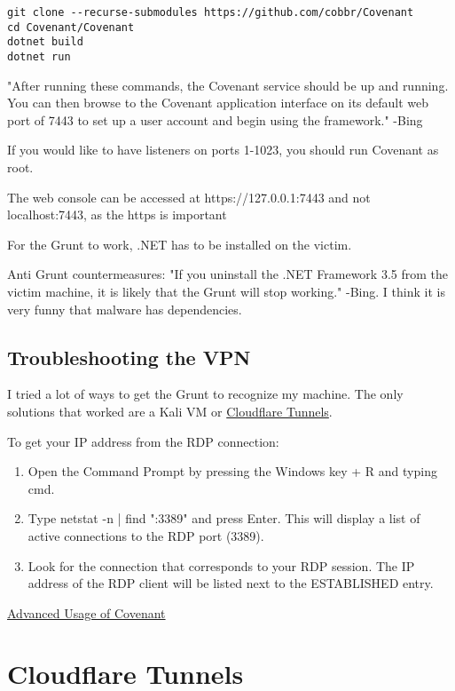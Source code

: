 \documentclass{article}
\begin{document}
\begin{lstlisting}
git clone --recurse-submodules https://github.com/cobbr/Covenant
cd Covenant/Covenant
dotnet build
dotnet run
\end{lstlisting}

"After running these commands, the Covenant service should be up and running. 
You can then browse to the Covenant application interface on its default web port of 
7443 to set up a user account and begin using the framework." -Bing

If you would like to have listeners on ports 1-1023, you should run Covenant as root.

The web console can be accessed at https://127.0.0.1:7443 and not localhost:7443, as the https is important

For the Grunt to work, .NET has to be installed on the victim.

Anti Grunt countermeasures:
"If you uninstall the .NET Framework 3.5 from the victim machine, 
it is likely that the Grunt will stop working." -Bing.
I think it is very funny that malware has dependencies.

\subsection{Troubleshooting the VPN}
I tried a lot of ways to get the Grunt to recognize my machine.
The only solutions that worked are a Kali VM or \href{sec:CloudflareTunnels}{Cloudflare Tunnels}.

To get your IP address from the RDP connection:
\begin{enumerate}
\item Open the Command Prompt by pressing the Windows key + R and typing cmd.
\item Type netstat -n | find ":3389" and press Enter. This will display a list of active connections to the RDP port (3389).
\item Look for the connection that corresponds to your RDP session. The IP address of the RDP client will be listed next to the ESTABLISHED entry.
\end{enumerate}

\href{https://youtu.be/Fi0jXm8VOFU}{Advanced Usage of Covenant}

\section{Cloudflare Tunnels}
\label{sec:CloudflareTunnels}
\end{document}
